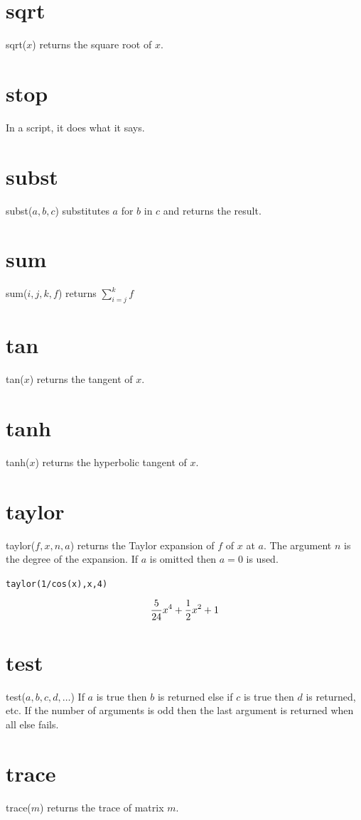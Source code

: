 \documentclass[12pt,openany]{report}
\begin{document}
\section*{sqrt}
sqrt($x$) returns the square root of $x$.

\section*{stop}
In a script, it does what it says.

\section*{subst}
subst($a,b,c$) substitutes $a$ for $b$ in $c$ and returns the result.

\section*{sum}
sum($i,j,k,f$) returns $\displaystyle\sum_{i=j}^k f$

\section*{tan}
tan($x$) returns the tangent of $x$.

\section*{tanh}
tanh($x$) returns the hyperbolic tangent of $x$.

\section*{taylor}
taylor($f,x,n,a$) returns the Taylor expansion of $f$ of $x$ at $a$.
The argument $n$ is the degree of the expansion.
If $a$ is omitted then $a=0$ is used.

\medskip
{\tt taylor(1/cos(x),x,4)}

$${5\over24}x^4+{1\over2}x^2+1$$

\section*{test}
test($a,b,c,d,\ldots$)
If $a$ is true then $b$ is returned else if $c$ is true then $d$ is returned, etc.
If the number of arguments is odd then the last argument is returned when all else fails.

\section*{trace}
trace($m$) returns the trace of matrix $m$.
\end{document}
